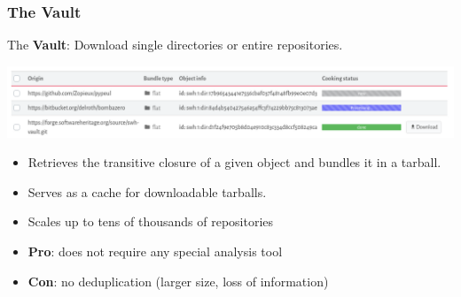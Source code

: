 \documentclass[aspectratio=169,xcolor=table]{beamer}
\begin{document}
    \begin{frame}
        \frametitle{The Vault}

        \begin{block}{}
            The \textbf{Vault}: Download single directories or entire
            repositories.
        \end{block}

        \begin{center}
            \includegraphics[width=\linewidth]{img/vault.png}
        \end{center}

        \begin{block}{}
            \begin{itemize}
                \item Retrieves the transitive closure of a
                    given object and bundles it in a tarball.
                \item Serves as a cache for downloadable tarballs.
                \item Scales up to tens of thousands of repositories
            \end{itemize}
        \end{block}

        \begin{block}{}
            \begin{itemize}
                \item \textbf{Pro}: does not require any special analysis tool
                \item \textbf{Con}: no deduplication (larger size, loss of
                    information)
            \end{itemize}
        \end{block}
    \end{frame}
\end{document}
